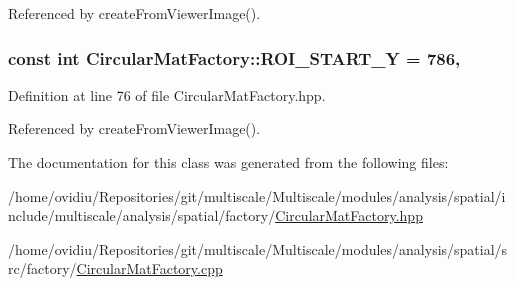 Referenced by create\-From\-Viewer\-Image().

\hypertarget{classmultiscale_1_1analysis_1_1CircularMatFactory_a94368fde6348afd7074491c2cf333910}{
\subsubsection[{R\-O\-I\-\_\-\-S\-T\-A\-R\-T\-\_\-\-Y}]{\setlength{\rightskip}{0pt plus 5cm}const int Circular\-Mat\-Factory\-::\-R\-O\-I\-\_\-\-S\-T\-A\-R\-T\-\_\-\-Y = 786\hspace{0.3cm}{\ttfamily [static]}, {\ttfamily [private]}}}\label{classmultiscale_1_1analysis_1_1CircularMatFactory_a94368fde6348afd7074491c2cf333910}


Definition at line 76 of file Circular\-Mat\-Factory.\-hpp.



Referenced by create\-From\-Viewer\-Image().



The documentation for this class was generated from the following files\-:\begin{DoxyCompactItemize}
\item 
/home/ovidiu/\-Repositories/git/multiscale/\-Multiscale/modules/analysis/spatial/include/multiscale/analysis/spatial/factory/\hyperlink{CircularMatFactory_8hpp}{Circular\-Mat\-Factory.\-hpp}\item 
/home/ovidiu/\-Repositories/git/multiscale/\-Multiscale/modules/analysis/spatial/src/factory/\hyperlink{CircularMatFactory_8cpp}{Circular\-Mat\-Factory.\-cpp}\end{DoxyCompactItemize}
